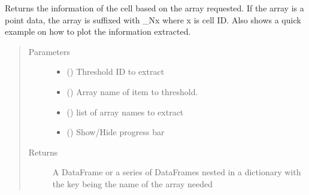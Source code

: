 \documentclass[letterpaper,10pt,english]{sphinxmanual}
\begin{document}
\begin{fulllineitems}
\begin{fulllineitems}
\begin{quote}
\begin{description}
\end{description}\end{quote}

\end{fulllineitems}


\begin{fulllineitems}
\label{\detokenize{openfdem:openfdem.openfdem.Model.extract_threshold_info}}
Returns the information of the cell based on the array requested.
If the array is a point data, the array is suffixed with \_Nx where x is cell ID.
Also shows a quick example on how to plot the information extracted.
\begin{quote}\begin{description}
\item[{Parameters}] \leavevmode\begin{itemize}
\item {} 
 () \textendash{} Threshold ID to extract

\item {} 
 () \textendash{} Array name of item to threshold.

\item {} 
 (\sphinxstyleliteralemphasis{\sphinxupquote{{[}}}\sphinxstyleliteralemphasis{\sphinxupquote{{]}}}) \textendash{} list of array names to extract

\item {} 
 () \textendash{} Show/Hide progress bar

\end{itemize}

\item[{Returns}] \leavevmode
A DataFrame or a series of DataFrames nested in a dictionary with the key being the name of the array needed


\end{description}
\end{quote}
\end{fulllineitems}
\end{fulllineitems}
\end{document}
